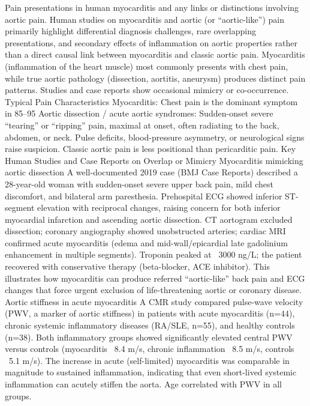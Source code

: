 Pain presentations in human myocarditis and any links or distinctions involving aortic pain.
Human studies on myocarditis and aortic (or “aortic-like”) pain primarily highlight differential diagnosis challenges, rare overlapping presentations, and secondary effects of inflammation on aortic properties rather than a direct causal link between myocarditis and classic aortic pain.
Myocarditis (inflammation of the heart muscle) most commonly presents with chest pain, while true aortic pathology (dissection, aortitis, aneurysm) produces distinct pain patterns. Studies and case reports show occasional mimicry or co-occurrence.
Typical Pain Characteristics
Myocarditis: Chest pain is the dominant symptom in 85–95%
Aortic dissection / acute aortic syndromes: Sudden-onset severe “tearing” or “ripping” pain, maximal at onset, often radiating to the back, abdomen, or neck. Pulse deficits, blood-pressure asymmetry, or neurological signs raise suspicion. Classic aortic pain is less positional than pericarditic pain.
Key Human Studies and Case Reports on Overlap or Mimicry
Myocarditis mimicking aortic dissection
A well-documented 2019 case (BMJ Case Reports) described a 28-year-old woman with sudden-onset severe upper back pain, mild chest discomfort, and bilateral arm paresthesia. Prehospital ECG showed inferior ST-segment elevation with reciprocal changes, raising concern for both inferior myocardial infarction and ascending aortic dissection. CT aortogram excluded dissection; coronary angiography showed unobstructed arteries; cardiac MRI confirmed acute myocarditis (edema and mid-wall/epicardial late gadolinium enhancement in multiple segments). Troponin peaked at ~3000 ng/L; the patient recovered with conservative therapy (beta-blocker, ACE inhibitor). This illustrates how myocarditis can produce referred “aortic-like” back pain and ECG changes that force urgent exclusion of life-threatening aortic or coronary disease.
Aortic stiffness in acute myocarditis
A CMR study compared pulse-wave velocity (PWV, a marker of aortic stiffness) in patients with acute myocarditis (n=44), chronic systemic inflammatory diseases (RA/SLE, n=55), and healthy controls (n=38). Both inflammatory groups showed significantly elevated central PWV versus controls (myocarditis ~8.4 m/s, chronic inflammation ~8.5 m/s, controls ~5.1 m/s). The increase in acute (self-limited) myocarditis was comparable in magnitude to sustained inflammation, indicating that even short-lived systemic inflammation can acutely stiffen the aorta. Age correlated with PWV in all groups.
